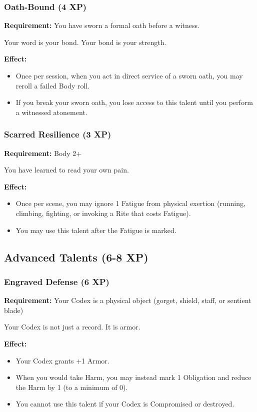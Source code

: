 \subsubsection{Oath-Bound (4 XP)}

\textbf{Requirement:} You have sworn a formal oath before a witness.

Your word is your bond. Your bond is your strength.

\textbf{Effect:}
\begin{itemize}
\item Once per session, when you act in direct service of a sworn oath, you may reroll a failed Body roll.
\item If you break your sworn oath, you lose access to this talent until you perform a witnessed atonement.
\end{itemize}

\subsubsection{Scarred Resilience (3 XP)}

\textbf{Requirement:} Body 2+

You have learned to read your own pain.

\textbf{Effect:}
\begin{itemize}
\item Once per scene, you may ignore 1 Fatigue from physical exertion (running, climbing, fighting, or invoking a Rite that costs Fatigue).
\item You may use this talent after the Fatigue is marked.
\end{itemize}

\subsection{Advanced Talents (6-8 XP)}

\subsubsection{Engraved Defense (6 XP)}

\textbf{Requirement:} Your Codex is a physical object (gorget, shield, staff, or sentient blade)

Your Codex is not just a record. It is armor.

\textbf{Effect:}
\begin{itemize}
\item Your Codex grants +1 Armor.
\item When you would take Harm, you may instead mark 1 Obligation and reduce the Harm by 1 (to a minimum of 0).
\item You cannot use this talent if your Codex is Compromised or destroyed.
\end{itemize}

